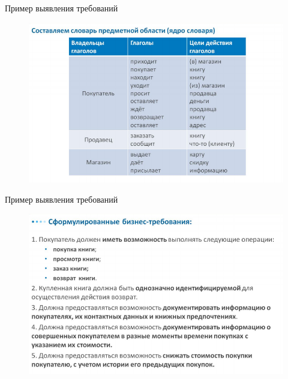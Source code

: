 \documentclass{beamer}
\begin{document}
\begin{frame}[t]{Пример выявления требований}
\begin{figure}[h]
\centering
\includegraphics[scale=0.5]{images/lec02-pic12.png}
\end{figure}
\end{frame}

\begin{frame}[t]{Пример выявления требований}
\begin{figure}[h]
\centering
\includegraphics[scale=0.5]{images/lec02-pic13.png}
\end{figure}
\end{frame}
\end{document}
